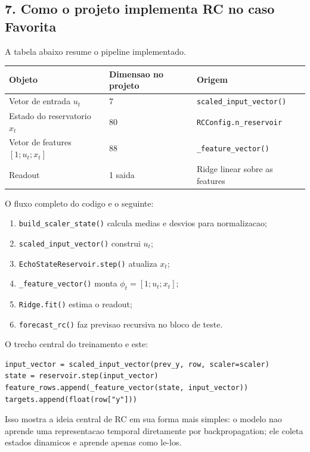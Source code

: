 \documentclass[12pt]{article}
\providecommand{\tightlist}{%
          \setlength{\itemsep}{0pt}\setlength{\parskip}{0pt}}
\begin{document}
\subsection{7. Como o projeto implementa RC no caso Favorita}\label{7-como-o-projeto-implementa-rc-no-caso-favorita}

A tabela abaixo resume o pipeline implementado.

\begin{longtable}[]{@{}lll@{}}
\toprule\noalign{}
Objeto & Dimensao no projeto & Origem \\
\midrule\noalign{}
\endhead
\bottomrule\noalign{}
\endlastfoot
Vetor de entrada \(u_t\) & 7 & \texttt{scaled\_input\_vector()} \\
Estado do reservatorio \(x_t\) & 80 & \texttt{RCConfig.n\_reservoir} \\
Vetor de features \([1; u_t; x_t]\) & 88 & \texttt{\_feature\_vector()} \\
Readout & 1 saida & Ridge linear sobre as features \\
\end{longtable}

O fluxo completo do codigo e o seguinte:

\begin{enumerate}
\def\labelenumi{\arabic{enumi}.}
\tightlist
\item
  \texttt{build\_scaler\_state()} calcula medias e desvios para normalizacao;
\item
  \texttt{scaled\_input\_vector()} construi \(u_t\);
\item
  \texttt{EchoStateReservoir.step()} atualiza \(x_t\);
\item
  \texttt{\_feature\_vector()} monta \(\phi_t = [1; u_t; x_t]\);
\item
  \texttt{Ridge.fit()} estima o readout;
\item
  \texttt{forecast\_rc()} faz previsao recursiva no bloco de teste.
\end{enumerate}

O trecho central do treinamento e este:

\begin{verbatim}
input_vector = scaled_input_vector(prev_y, row, scaler=scaler)
state = reservoir.step(input_vector)
feature_rows.append(_feature_vector(state, input_vector))
targets.append(float(row["y"]))
\end{verbatim}

Isso mostra a ideia central de RC em sua forma mais simples: o modelo nao aprende uma representacao temporal diretamente por backpropagation; ele coleta estados dinamicos e aprende apenas como le-los.
\end{document}
